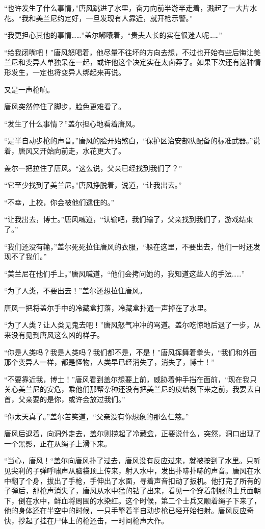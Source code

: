 “也许发生了什么事情，”唐风跳进了水里，奋力向前半游半走着，溅起了一大片水花。“我和美兰尼约定好，一旦发现有人靠近，就开枪示警。”

“我更担心其他的事情……”盖尔嘟囔着，“贵夫人长的实在很迷人呢……”

“给我闭嘴吧！”唐风怒喝着，他尽量不往坏的方向去想，不过也开始有些后悔让美兰尼和变异人单独呆在一起，或许他这个决定实在太卤莽了。如果下次还有这种情形发生，一定也将变异人绑起来再说。

又是一声枪响。

唐风突然停住了脚步，脸色更难看了。

“发生了什么事情？”盖尔担心地看着唐风。

“是半自动步枪的声音。”唐风的脸开始煞白，“保护区治安部队配备的标准武器。”说着，唐风又开始向前走，水花更大了。

盖尔一把拉住了唐风。“这么说，父亲已经找到我们了？”

“它至少找到了美兰尼。”唐风挣脱着，说道，“让我出去。”

“不幸，上校，你会被他们逮住的。”

“让我出去，博士。”唐风喊道，“认输吧，我们输了，父亲找到我们了，游戏结束了。”

“我们还没有输，”盖尔死死拉住唐风的衣服，“躲在这里，不要出去，他们一时还发现不了我们。”

“美兰尼在他们手上。”唐风喊道，“他们会拷问她的，我知道这些人的手法……”

“为了人类，不要出去！”盖尔还想拉住唐风。

唐风一把将盖尔手中的冷藏盒打落，冷藏盒扑通一声掉在了水里。

“为了人类？让人类见鬼去吧！”唐风怒气冲冲的骂道。盖尔吃惊地后退了一步，从来没有见到唐风这么凶的样子。

“你是人类吗？我是人类吗？我们都不是，不是！”唐风挥舞着拳头，“我们和外面那个变异人一样，都是怪物，人类早已经消失了，消失了，博士！”

“不要靠近我，博士！”唐风看到盖尔想要上前，威胁着伸手挡在面前，“现在我只关心美兰尼的安危，乘他们那帮杂种还没有把美兰尼的皮给剥下来之前，我要去自首，父亲要的是你，或许会放过我们。”

“你太天真了。”盖尔苦笑道，“父亲没有你想象的那么仁慈。”

唐风后退着，向洞外走去，盖尔则捞起了冷藏盒，正要说什么，突然，洞口出现了一个黑影，正在从绳子上滑下来。

“当心，唐风！“盖尔向唐风扑了过去，唐风没有反应过来，就被按到了水里。只听见尖利的子弹呼啸声从脑袋顶上传来，射入水中，发出扑哧扑哧的声音。唐风在水中翻了个身，拔出了手枪，手伸出了水面，寻着声音扣动了扳机。他打完了所有的子弹后，那枪声消失了，唐风从水中猛的钻了出来，看见一个穿着制服的士兵面朝下，倒在水中，鲜血将周围的水染红。这个时候，第二个士兵又顺着绳子下来了，他的身体还在半空中的时候，一只手擎着半自动步枪已经开始扫射。唐风反应奇快，抄起了挂在尸体上的枪还击，一时间枪声大作。

